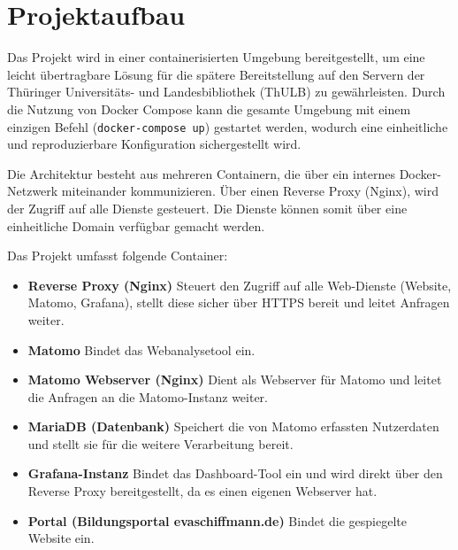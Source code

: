 \section{Projektaufbau}
\label{sec:projektaufbau}
Das Projekt wird in einer containerisierten Umgebung bereitgestellt, um eine leicht übertragbare Lösung für die spätere Bereitstellung auf den Servern der Thüringer Universitäts- und Landesbibliothek (ThULB) zu gewährleisten. Durch die Nutzung von Docker Compose kann die gesamte Umgebung mit einem einzigen Befehl (\texttt{docker-compose up}) gestartet werden, wodurch eine einheitliche und reproduzierbare Konfiguration sichergestellt wird.

Die Architektur besteht aus mehreren Containern, die über ein internes Docker-Netzwerk miteinander kommunizieren. Über einen Reverse Proxy (Nginx), wird der Zugriff auf alle Dienste gesteuert. Die Dienste können somit über eine einheitliche Domain verfügbar gemacht werden.

Das Projekt umfasst folgende Container:

\begin{itemize}
    \item \textbf{Reverse Proxy (Nginx)}  
    Steuert den Zugriff auf alle Web-Dienste (Website, Matomo, Grafana), stellt diese sicher über HTTPS bereit und leitet Anfragen weiter.

    \item \textbf{Matomo}  
    Bindet das Webanalysetool ein.

    \item \textbf{Matomo Webserver (Nginx)}  
    Dient als Webserver für Matomo und leitet die Anfragen an die Matomo-Instanz weiter.

    \item \textbf{MariaDB (Datenbank)}  
    Speichert die von Matomo erfassten Nutzerdaten und stellt sie für die weitere Verarbeitung bereit.

    \item \textbf{Grafana-Instanz}  
    Bindet das Dashboard-Tool ein und wird direkt über den Reverse Proxy bereitgestellt, da es einen eigenen Webserver hat.

    \item \textbf{Portal (Bildungsportal evaschiffmann.de)}  
    Bindet die gespiegelte Website ein.
\end{itemize}

